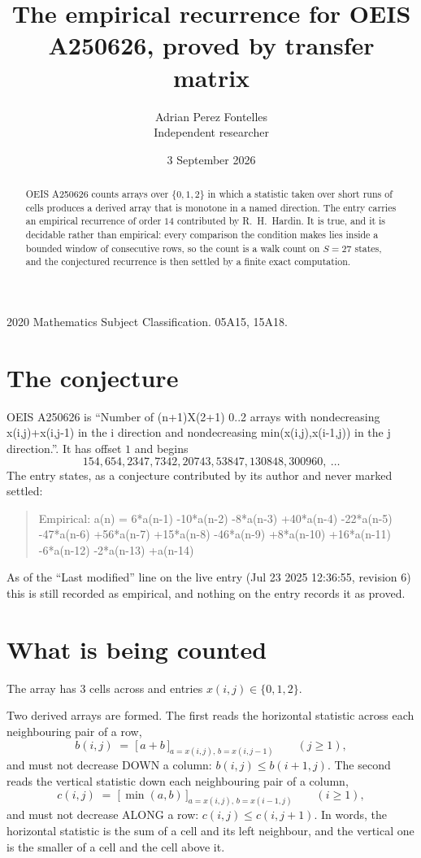 \documentclass[11pt,a4paper]{article}
\title{The empirical recurrence for OEIS A250626, proved by transfer matrix}
\author{Adrian Perez Fontelles\\ \small Independent researcher}
\date{3 September 2026}
\theoremstyle{plain}
\theoremstyle{definition}
\begin{document}
\maketitle

\begin{abstract}
OEIS A250626 counts arrays over $\{0,1,2\}$ in which a statistic taken over short runs
of cells produces a derived array that is monotone in a named direction. The entry carries an
empirical recurrence of order $14$ contributed by R.~H.~Hardin. It is true, and it is
decidable rather than empirical: every comparison the condition makes lies inside a bounded
window of consecutive rows, so the count is a walk count on $S=27$ states, and the
conjectured recurrence is then settled by a finite exact computation.
\end{abstract}

\noindent\small 2020 Mathematics Subject Classification. 05A15, 15A18.\normalsize

\section{The conjecture}

OEIS A250626 is ``Number of (n+1)X(2+1) 0..2 arrays with nondecreasing x(i,j)+x(i,j-1) in the i direction and nondecreasing min(x(i,j),x(i-1,j)) in the j direction.''. It has offset $1$ and begins
\[
154, 654, 2347, 7342, 20743, 53847, 130848, 300960,\ \dots
\]
The entry states, as a conjecture contributed by its author and never marked settled:
\begin{quote}
Empirical: a(n) = 6*a(n-1) -10*a(n-2) -8*a(n-3) +40*a(n-4) -22*a(n-5) -47*a(n-6) +56*a(n-7) +15*a(n-8) -46*a(n-9) +8*a(n-10) +16*a(n-11) -6*a(n-12) -2*a(n-13) +a(n-14)
\end{quote}
As of the ``Last modified'' line on the live entry (Jul 23 2025 12:36:55, revision 6) this is still
recorded as empirical, and nothing on the entry records it as proved.

\section{What is being counted}

The array has $3$ cells across and entries $x(i,j)\in\{0,1,2\}$.

Two derived arrays are formed. The first reads the horizontal statistic across each
neighbouring pair of a row,
\[
b(i,j)\;=\;\bigl[\,a+b\,\bigr]_{a=x(i,j),\,b=x(i,j-1)}\qquad (j\ge1),
\]
and must not decrease DOWN a column: $b(i,j)\le b(i{+}1,j)$. The second reads the vertical
statistic down each neighbouring pair of a column,
\[
c(i,j)\;=\;\bigl[\,\min(a,b)\,\bigr]_{a=x(i,j),\,b=x(i{-}1,j)}\qquad (i\ge1),
\]
and must not decrease ALONG a row: $c(i,j)\le c(i,j{+}1)$. In words, the horizontal statistic
is the sum of a cell and its left neighbour, and the vertical one is
the smaller of a cell and the cell above it.
\end{document}
